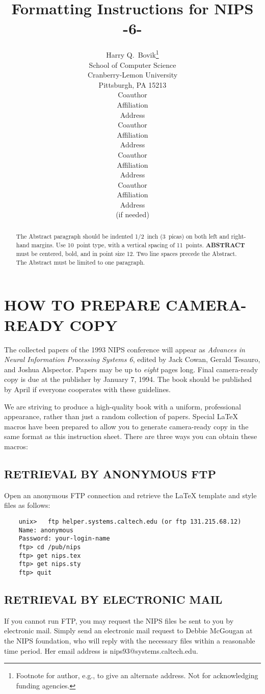 \documentclass{article} %
\title{Formatting Instructions for NIPS -6-}
\author{Harry Q.~Bovik\thanks{Footnote for author, e.g., to
give an alternate address.  Not for acknowledging funding
agencies.} \\
School of Computer Science\\ 
Cranberry-Lemon University\\
Pittsburgh, PA 15213 \\
\And
Coauthor  \\
Affiliation          \\
Address \\             
\AND
Coauthor  \\
Affiliation          \\
Address \\             
\And
Coauthor  \\
Affiliation          \\
Address \\             
\And
Coauthor   \\
Affiliation \\         
Address    \\          
(if needed)\\
}
\begin{document}
\maketitle



\begin{abstract}
The Abstract paragraph should be indented 1/2~inch (3~picas) on
both left and right-hand margins. Use 10~point type, with a
vertical spacing of 11~points.  {\bf ABSTRACT} must be centered,
bold, and in point size 12. Two line spaces precede the Abstract.
The Abstract must be limited to one paragraph.
\end{abstract}

\section{HOW TO PREPARE CAMERA-READY COPY}
The collected papers of the 1993 NIPS conference will appear as
{\it Advances in Neural Information Processing Systems 6}, edited
by Jack Cowan, Gerald Tesauro, and Joshua Alspector.  Papers
may be up to {\it eight} pages long.  Final camera-ready copy is
due at the publisher by January 7, 1994.  The book should be
published by April if everyone cooperates with these guidelines.

We are striving to produce a high-quality book with a uniform,
professional appearance, rather than just a random collection of
papers. Special \LaTeX{} macros have been prepared to allow
you to generate camera-ready copy in the same format as this
instruction sheet.  There are three ways you can obtain these
macros:

\subsection{RETRIEVAL BY ANONYMOUS FTP}
Open an anonymous FTP connection and retrieve the \LaTeX{} template and
style files as follows:

\begin{verbatim}
	unix> 	ftp helper.systems.caltech.edu (or ftp 131.215.68.12)
	Name: anonymous
	Password: your-login-name
	ftp> cd /pub/nips
	ftp> get nips.tex
	ftp> get nips.sty
	ftp> quit
\end{verbatim}

\subsection{RETRIEVAL BY ELECTRONIC MAIL}
If you cannot run FTP, you may request the NIPS files be sent to
you by electronic mail.  Simply send an electronic mail request to
Debbie McGougan at the NIPS foundation, who will
reply with the necessary files within a reasonable time period.  
Her email address is nips93@systems.caltech.edu.
\end{document}
